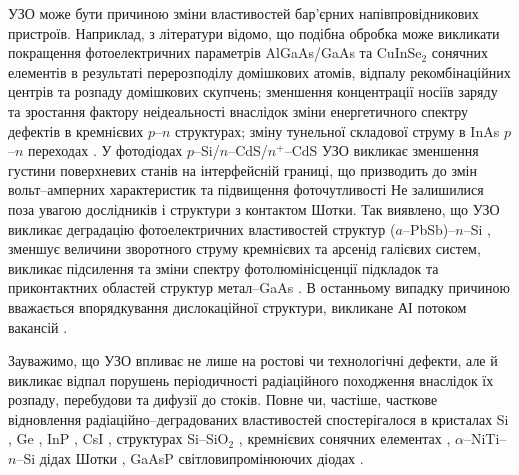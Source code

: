 УЗО може бути причиною зміни властивостей бар'єрних напівпровідникових пристроїв.
Наприклад, з літератури відомо, що подібна обробка може викликати покращення фотоелектричних параметрів AlGaAs/GaAs \cite{Zaver2005} та CuInSe$_2$ \cite{OstapSC} сонячних елементів в результаті перерозподілу домішкових атомів, відпалу рекомбінаційних центрів та розпаду домішкових скупчень;
зменшення концентрації носіїв заряду \cite{Davletova2008}
та зростання фактору неідеальності \cite{Davletova2009}
внаслідок зміни енергетичного спектру дефектів в кремнієвих $p$--$n$ структурах;
зміну тунельної складової струму в InAs $p$--$n$ переходах \cite{Teterkin2009r}.
У фотодіодах $p$--Si/$n$--CdS/$n^+$--CdS УЗО викликає зменшення густини поверхневих станів на інтерфейсній границі,
що призводить до змін вольт--амперних характеристик та підвищення фоточутливості \cite{Mirsagatov,Mirsagatov2}
Не залишилися поза увагою дослідників і структури з контактом Шотки.
Так виявлено, що УЗО викликає деградацію фотоелектричних властивостей структур ($a$--PbSb)--$n$--Si \cite{Pashaev2012r,PashOJA},
зменшує величини зворотного струму кремнієвих \cite{Tagaev} та арсенід галієвих \cite{UST:SDErmol} систем,
викликає підсилення та зміни спектру фотолюмінісценції підкладок та приконтактних областей структур метал--GaAs \cite{UST:SDErmol}.
В останньому випадку причиною вважається впорядкування дислокаційної структури, викликане АІ потоком вакансій \cite{UST:SDErmol}.

Зауважимо, що УЗО впливає не лише на ростові чи технологічні дефекти, але й викликає відпал порушень періодичності радіаційного походження внаслідок їх розпаду, перебудови та дифузії до стоків.
Повне чи, частіше, часткове відновлення радіаційно--деградованих властивостей спостерігалося
в кристалах Si  \cite{OstrovRadSi,Podolian2012r,PodolHivr,YOlikh2006TPLr}, Ge \cite{Olikh:FTP1996},
InP \cite{OlikhProc}, CsI \cite{UST:OstrovCsI}, структурах Si--SiO$_2$ \cite{Parchinskii2000r,Parchinskii2006r},
кремнієвих сонячних елементах \cite{YOlikh2007TPLr},
$\alpha$--NiTi--$n$--Si дідах Шотки \cite{Pashaev2014r},
GaAsP світловипромінюючих діодах \cite{US:LED,UST:LED_SM}.



